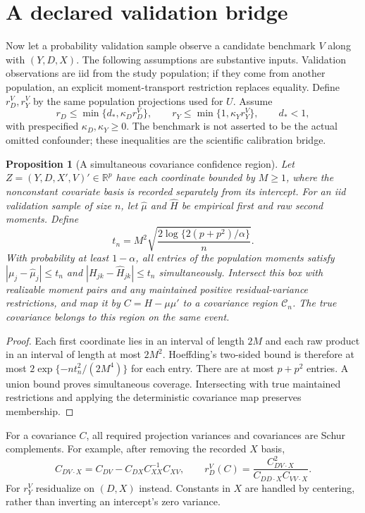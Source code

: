\documentclass[11pt]{article}
\newtheorem{proposition}[theorem]{Proposition}
\theoremstyle{remark}
\begin{document}
\section*{A declared validation bridge}
Now let a probability validation sample observe a candidate benchmark $V$ along with $(Y,D,X)$. The following assumptions are substantive inputs. Validation observations are iid from the study population; if they come from another population, an explicit moment-transport restriction replaces equality. Define $r_D^V,r_Y^V$ by the same population projections used for $U$. Assume
\[
 r_D\le\min\{d_*,\kappa_D r_D^V\},\qquad
 r_Y\le\min\{1,\kappa_Y r_Y^V\},\qquad d_*<1,
\]
with prespecified $\kappa_D,\kappa_Y\ge0$. The benchmark is not asserted to be the actual omitted confounder; these inequalities are the scientific calibration bridge.

\begin{proposition}[A simultaneous covariance confidence region]
Let $Z=(Y,D,X',V)'\in\mathbb R^p$ have each coordinate bounded by $M\ge1$, where the nonconstant covariate basis is recorded separately from its intercept. For an iid validation sample of size $n$, let $\widehat\mu$ and $\widehat H$ be empirical first and raw second moments. Define
\[
 t_n=M^2\sqrt{\frac{2\log\{2(p+p^2)/\alpha\}}n}.
\]
With probability at least $1-\alpha$, all entries of the population moments satisfy
$|\mu_j-\widehat\mu_j|\le t_n$ and $|H_{jk}-\widehat H_{jk}|\le t_n$ simultaneously. Intersect this box with realizable moment pairs and any maintained positive residual-variance restrictions, and map it by $C=H-\mu\mu'$ to a covariance region $\mathcal C_n$. The true covariance belongs to this region on the same event.
\end{proposition}
\begin{proof}
Each first coordinate lies in an interval of length $2M$ and each raw product in an interval of length at most $2M^2$. Hoeffding's two-sided bound is therefore at most $2\exp\{-nt_n^2/(2M^4)\}$ for each entry. There are at most $p+p^2$ entries. A union bound proves simultaneous coverage. Intersecting with true maintained restrictions and applying the deterministic covariance map preserves membership.
\end{proof}
For a covariance $C$, all required projection variances and covariances are Schur complements. For example, after removing the recorded $X$ basis,
\[
 C_{DV\cdot X}=C_{DV}-C_{DX}C_{XX}^{-1}C_{XV},\qquad
 r_D^V(C)=\frac{C_{DV\cdot X}^2}{C_{DD\cdot X}C_{VV\cdot X}}.
\]
For $r_Y^V$ residualize on $(D,X)$ instead. Constants in $X$ are handled by centering, rather than inverting an intercept's zero variance.
\end{document}
